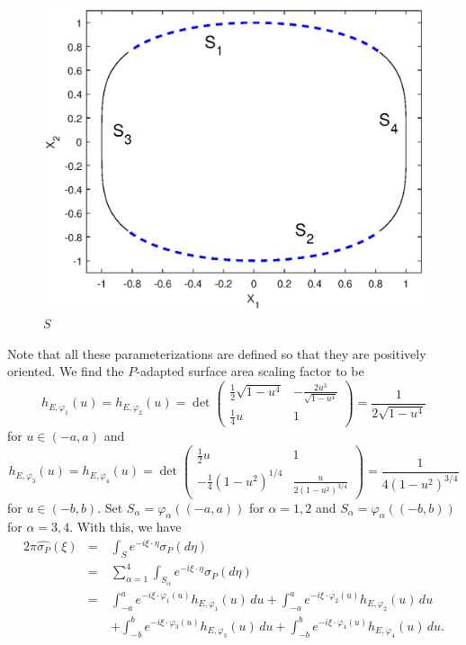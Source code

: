 \documentclass[11pt]{article}
\renewcommand\det{\operatorname{det}}
\newcommand{\f}[2]{\frac{#1}{#2}}
\newcommand{\al}{\alpha}
\begin{document}
\begin{figure}[!htb]
    \centering
    \includegraphics[scale=0.6]{S.eps}
    \caption{$S$}
    \label{fig:S}
\end{figure}

Note that all these parameterizations are defined so that they are positively oriented. We find the $P$-adapted surface area scaling factor to be 
\begin{equation*}
    h_{E,\varphi_1}(u) = h_{E,\varphi_2}(u) = {\det \begin{pmatrix} 
    \f{1}{2}\sqrt{1-u^4} &  -\f{2u^3}{\sqrt{1-u^4}} \\
    \f{1}{4}u & 1
    \end{pmatrix}} = \f{1}{2\sqrt{1-u^4}}
\end{equation*}
for $u\in(-a,a)$ and
\begin{equation*}
    h_{E,\varphi_3}(u) = h_{E,\varphi_4}(u) = {\det\begin{pmatrix}
    \f{1}{2}u&  1  \\
    -\f{1}{4}(1-u^2)^{1/4}  & \f{u}{2(1-u^2)^{3/4}}
    \end{pmatrix}} = \f{1}{4(1 - u^2)^{3/4}}
\end{equation*}
for $u\in(-b,b)$. Set $S_\al=\varphi_\al((-a,a))$ for $\al = 1,2$ and $S_\al=\varphi_\al((-b,b))$ for $\al  = 3,4$. With this, we have
\begin{eqnarray*}
    2\pi \widehat{\sigma_P}(\xi) 
    &=& \int_S e^{-i \xi \cdot \eta }\sigma_P (d\eta) \\
    &=& \sum^{4}_{\al = 1} \int_{S_\al} e^{-i \xi \cdot \eta} \sigma_P(d\eta)\\
    &=& \int_{-a}^a  e^{-i \xi \cdot \varphi_1(u)} h_{E,\varphi_1}(u)\,du  + \int_{-a}^a  e^{-i \xi \cdot \varphi_2(u)} h_{E,\varphi_2}(u)\,du \\
    &\quad& + \int_{-b}^b e^{-i \xi \cdot \varphi_3(u)} h_{E,\varphi_3}(u)\,du + \int_{-b}^b e^{-i \xi \cdot \varphi_4(u)} h_{E,\varphi_4}(u)\,du.
\end{eqnarray*}
\end{document}
